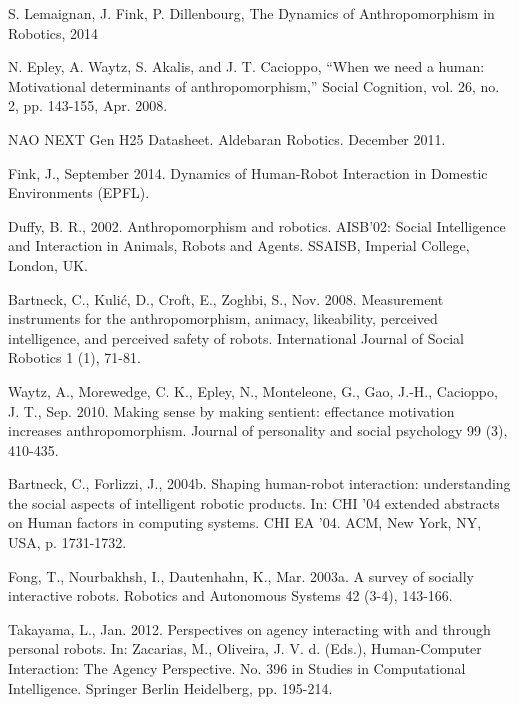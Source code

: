 \documentclass{acm_proc_article-sp}
\begin{document}
\begin{thebibliography}{99}

S. Lemaignan, J. Fink, P. Dillenbourg, The Dynamics of Anthropomorphism in Robotics, 2014

N. Epley, A. Waytz, S. Akalis, and J. T. Cacioppo, ``When we need a human: Motivational determinants of anthropomorphism,'' Social Cognition,
vol. 26, no. 2, pp. 143-155, Apr. 2008.

NAO NEXT Gen H25 Datasheet. Aldebaran Robotics. 
December 2011.

Fink, J., September 2014. Dynamics of Human-Robot 
Interaction in Domestic Environments (EPFL).

Duffy, B. R., 2002. Anthropomorphism and robotics. AISB'02: Social Intelligence and Interaction
in Animals, Robots and Agents. SSAISB, Imperial College, London, UK.

Bartneck, C., Kuli\'{c}, D., Croft, E., Zoghbi, S., Nov. 2008. Measurement instruments for the
anthropomorphism, animacy, likeability, perceived intelligence, and perceived safety of robots.
International Journal of Social Robotics 1 (1), 71-81.

Waytz, A., Morewedge, C. K., Epley, N., Monteleone, G., Gao, J.-H., Cacioppo, J. T., Sep. 2010.
Making sense by making sentient: effectance motivation increases anthropomorphism. Journal
of personality and social psychology 99 (3), 410-435.


 Bartneck, C., Forlizzi, J., 2004b. Shaping human-robot interaction: understanding the social
aspects of intelligent robotic products. In: CHI '04 extended abstracts on Human factors in
computing systems. CHI EA '04. ACM, New York, NY, USA, p. 1731-1732.

Fong, T., Nourbakhsh, I., Dautenhahn, K., Mar. 2003a. A survey of socially interactive robots.
Robotics and Autonomous Systems 42 (3-4), 143-166.


Takayama, L., Jan. 2012. Perspectives on agency interacting with and through personal robots. In:
Zacarias, M., Oliveira, J. V. d. (Eds.), Human-Computer Interaction: The Agency Perspective.
No. 396 in Studies in Computational Intelligence. Springer Berlin Heidelberg, pp. 195-214.


\end{thebibliography}
\end{document}

